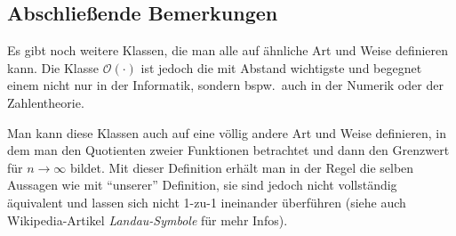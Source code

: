 \documentclass[fontsize=12pt,paper=14,div=calc,parskip=full]{scrartcl}
\begin{document}
\subsection*{Abschließende Bemerkungen} Es gibt noch weitere Klassen,
die man alle auf ähnliche Art und Weise definieren kann. Die Klasse
$\mathcal{O}(\cdot)$ ist jedoch die mit Abstand wichtigste und
begegnet einem nicht nur in der Informatik, sondern bspw.\ auch in der
Numerik oder der Zahlentheorie.

Man kann diese Klassen auch auf eine völlig andere Art und Weise
definieren, in dem man den Quotienten zweier Funktionen betrachtet und
dann den Grenzwert für $n \rightarrow \infty$ bildet. Mit dieser
Definition erhält man in der Regel die selben Aussagen wie mit
``unserer'' Definition, sie sind jedoch nicht vollständig äquivalent
und lassen sich nicht 1-zu-1 ineinander überführen (siehe auch
Wikipedia-Artikel \emph{Landau-Symbole} für mehr Infos).
\end{document}
